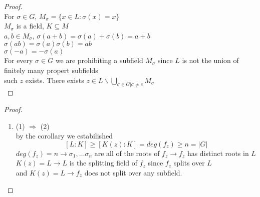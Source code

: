 \documentclass{article}
\begin{document}
\begin{proof}
    \leavevmode \\ 
    For 
    $\sigma \in G$, $M_{\sigma} = \{x \in L: \sigma(x) = x\}$ \\ 
    $M_{\sigma}$ is a field, $K \subseteq M$ \\
    $a,b \in M_{\sigma}$, $\sigma(a + b) = \sigma(a) + \sigma(b) = a + b$ \\
    $\sigma(ab) = \sigma(a) \sigma(b) = ab$ \\
    $\sigma(-a) = - \sigma(a)$ \\ 
    For every $\sigma \in G$ we are prohibiting a subfield $M_{\sigma}$ since $L$ is not the union of finitely many propert subfields \\ such $z$ exists. There exists $z\in L \backslash \bigcup_{\sigma \in G | \sigma \not = e} M_{\sigma}$ \\
\end{proof}
\begin{proof}
    \leavevmode \\ 
    \begin{enumerate}
        \item (1) $\Rightarrow$ (2) \\ 
        by the corollary we estabilished 
        $$[L:K] \geq [K(z) :K] = deg(f_z) \geq n = |G|$$
        $deg(f_z) = n \rightarrow \sigma_1, \dots \sigma_n$ are all of the roots of $f_z \rightarrow f_z$ has distinct roots in $L$ \\ 
        $K(z) = L \rightarrow L$ is the splitting field of $f_z$ since $f_z $ splits over $L$ \\ and $K(z) = L \rightarrow f_z$ does not split over any subfield. 
        
    \end{enumerate}
  
    
    
\end{proof}
\end{document}
